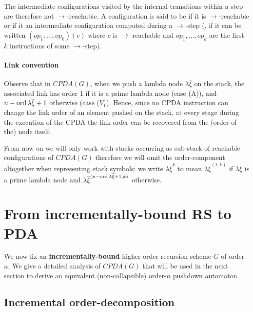 \documentclass[a4paper]{article}[12pt]
\theoremstyle{remark}
\theoremstyle{definition}
\begin{document}
The intermediate configurations visited by the internal transitions within a step are therefore not $\rightarrow$-reachable.
A configuration is said to be  if it is $\rightarrow$-reachable or if it
an intermediate configuration computed during a $\rightarrow$-step
(\ie, if it can be written $(op_1;\ldots;op_k)(c)$ where $c$ is $\rightarrow$-reachable and
$op_1, \ldots, op_k$ are the first $k$ instructions of some $\rightarrow$-step).

\paragraph{Link convention}
Observe that in $CPDA(G)$, when we push a lambda node $\lambda \overline{\xi}$ on the stack, the associated link has order $1$ if it is a prime lambda node (case (A)), and $n-\mathop{\mathrm{ord}}{\lambda \overline{\xi}}+1$ otherwise (case ($V_1$). Hence, since no CPDA instruction can change the link order of an element pushed on the stack, at every stage during the execution of the CPDA the link order can be recovered from the (order of the) node itself.

From now on we will only work with stacks occurring as sub-stack of reachable configurations of $CPDA(G)$
therefore we will omit the order-component altogether when representing stack symbols: we write $\lambda\overline\xi^{k}$ to mean  $\lambda\overline\xi^{(1,k)}$ if $\lambda\overline\xi$ is a prime lambda node
and $\lambda\overline\xi^{(n-\mathop{\mathrm{ord}}{\lambda \overline{\xi}}+1,k)}$ otherwise.

\section{From incrementally-bound RS to PDA}
\label{sec:IncrementallyBoundRSToPDA}
We now fix an {\bf incrementally-bound} higher-order recursion scheme $G$ of order $n$.
We give a detailed analysis of $CPDA(G)$ that will be used in the next section to derive an equivalent (non-collapsible) order-$n$ pushdown automaton.

\subsection{Incremental order-decomposition}
\end{document}
